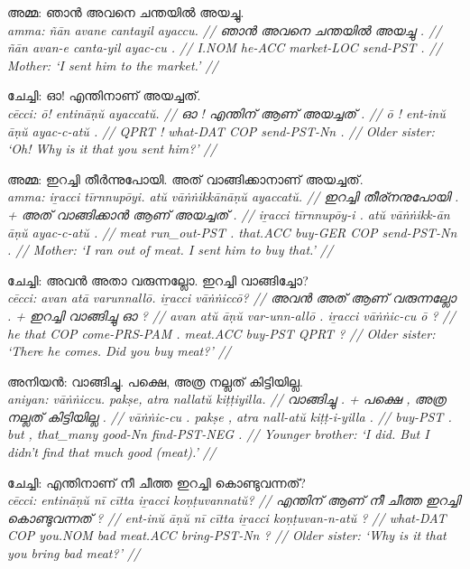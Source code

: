\documentclass[a4paper]{article}
\begin{document}
\ex\begingl
\glpreamble അമ്മ: ഞാൻ അവനെ ചന്തയിൽ അയച്ചു. \\
\itshape amma: ñān avane cantayil ayaccu. //
\gla ഞാൻ അവനെ ചന്തയിൽ അയച്ചു . //
\glb ñān avan-e canta-yil ayac-cu . //
\glc I.NOM he-ACC market-LOC send-PST . //
\glft Mother: `I sent him to the market.' //
\endgl\xe

\ex\begingl
\glpreamble ചേച്ചി: ഓ! എന്തിനാണ് അയച്ചത്. \\
\itshape cēcci: ō! entināṇŭ ayaccatŭ. //
\gla ഓ ! എന്തിന് ആണ് അയച്ചത് . //
\glb ō ! ent-inŭ āṇŭ ayac-c-atŭ . //
\glc QPRT\footnotemark{} ! what-DAT COP send-PST-Nn . //
\glft Older sister: `Oh! Why is it that you sent him?' //
\endgl\xe


\ex\begingl
\glpreamble അമ്മ: ഇറച്ചി തീർന്നുപോയി. അത് വാങ്ങിക്കാനാണ് അയച്ചത്. \\
\itshape amma: iṟacci tīrnnupōyi. atŭ vāṅṅikkānāṇŭ ayaccatŭ. //
\gla ഇറച്ചി തീര്നനുപോയി . + അത് വാങ്ങിക്കാൻ ആണ് അയച്ചത് . //
\glb iṟacci tīrnnupōy-i . atŭ vāṅṅikk-ān āṇŭ ayac-c-atŭ . //
\glc meat run\_out-PST . that.ACC buy-GER COP send-PST-Nn . //
\glft Mother: `I ran out of meat. I sent him to buy that.' //
\endgl\xe

\ex\begingl
\glpreamble ചേച്ചി: അവൻ അതാ വരുന്നല്ലോ. ഇറച്ചി വാങ്ങിച്ചോ? \\
\itshape cēcci: avan atā varunnallō. iṟacci vāṅṅiccō? //
\gla അവൻ അത് ആണ് വരുന്നല്ലോ . + ഇറച്ചി വാങ്ങിച്ചു ഓ ? //
\glb avan atŭ āṇŭ var-unn-allō . iṟacci vāṅṅic-cu ō ? //
\glc he that COP come-PRS-PAM . meat.ACC buy-PST QPRT ? //
\glft Older sister: `There he comes. Did you buy meat?' //
\endgl\xe

\ex\begingl
\glpreamble അനിയൻ: വാങ്ങിച്ചു. പക്ഷെ, അത്ര നല്ലത് കിട്ടിയില്ല. \\
\itshape aniyan: vāṅṅiccu. pakṣe, atra nallatŭ kiṭṭiyilla. //
\gla വാങ്ങിച്ചു . + പക്ഷെ , അത്ര നല്ലത് കിട്ടിയില്ല . //
\glb vāṅṅic-cu . pakṣe , atra nall-atŭ kiṭṭ-i-yilla . //
\glc buy-PST . but , that\_many good-Nn find-PST-NEG . //
\glft Younger brother: `I did. But I didn't find that much good (meat).' //
\endgl\xe

\ex\begingl
\glpreamble ചേച്ചി: എന്തിനാണ് നീ ചീത്ത ഇറച്ചി കൊണ്ടുവന്നത്? \\
\itshape cēcci: entināṇŭ nī cītta iṟacci koṇṭuvannatŭ? //
\gla എന്തിന് ആണ് നീ ചീത്ത ഇറച്ചി കൊണ്ടുവന്നത് ? //
\glb ent-inŭ āṇŭ nī cītta iṟacci koṇṭuvan-n-atŭ ? //
\glc what-DAT COP you.NOM bad meat.ACC bring-PST-Nn ? //
\glft Older sister: `Why is it that you bring bad meat?' //
\endgl\xe
\end{document}
